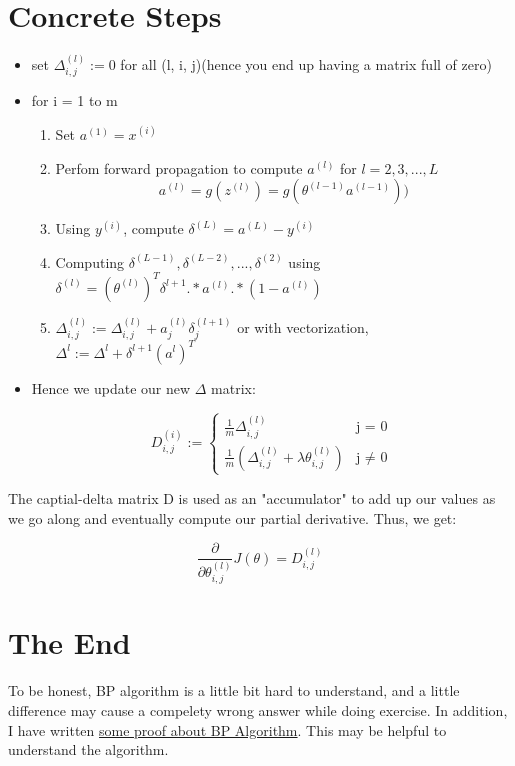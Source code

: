 \documentclass[11pt]{article}
\begin{document}
	\section{Concrete Steps}
		\begin{itemize}
			\item {set $\Delta_{i, j}^{(l)} := 0$ for all (l, i, j)(hence you end up having a matrix full of zero)}
			\item{for i = 1 to m
				\begin{enumerate}
					\item Set $a^{(1)} = x^{(i)}$
					\item Perfom forward propagation to compute $a^{(l)}$ for $l=2,3,...,L$
					$$
					a^{(l)} = g(z^{(l)}) = g(\theta ^{(l-1)}a^{(l - 1)}))
					$$
					\item Using $y^{(i)}$, compute $\delta ^{(L)} = a^{(L)} - y^{(i)}$
					\item Computing $\delta^{(L-1)}, \delta^{(L-2)}, ..., \delta^{(2)}$ using $\delta^{(l)} = (\theta^{(l)})^{T}\delta^{l+1} .* a^{(l)} .* (1-a^{(l)})$
					\item $\Delta_{i,j}^{(l)} := \Delta_{i,j}^{(l)} + a_{j}^{(l)} \delta_{j}^{(l+1)}$ or with vectorization, $\Delta^{l} := \Delta^{l} + \delta^{l+1}(a^{l})^T$
				\end{enumerate}
				}
			\item Hence we update our new $\Delta$ matrix:
			
			\begin{equation*}
				D_{i,j}^{(i)} := 
				\begin{cases}
					\frac{1}{m} \Delta_{i,j}^{(l)}  &\mbox{j = 0} \\
					\frac{1}{m}(\Delta_{i,j}^{(l)} + \lambda \theta_{i,j}^{(l)})  &\mbox{j $\neq$ 0}
				\end{cases}
			\end{equation*}
		\end{itemize}
		
		The captial-delta matrix D is used as an "accumulator" to add up our values as we go along and eventually compute our partial derivative. Thus, we get:
		
		$$
		\frac{\partial}{\partial \theta_{i, j}^{(l)}}J(\theta) = D_{i, j}^{(l)}
		$$
	
	
	\section{The End} 
		To be honest, BP algorithm is a little bit hard to understand, and a little difference may cause a compelety wrong answer while doing exercise. In addition, I have written \href{https://ramay7.github.io/2017/03/01/Some-proof-about-BP-Algorithm/}{some proof about BP Algorithm}. This may be helpful to understand the algorithm.
\end{document}
